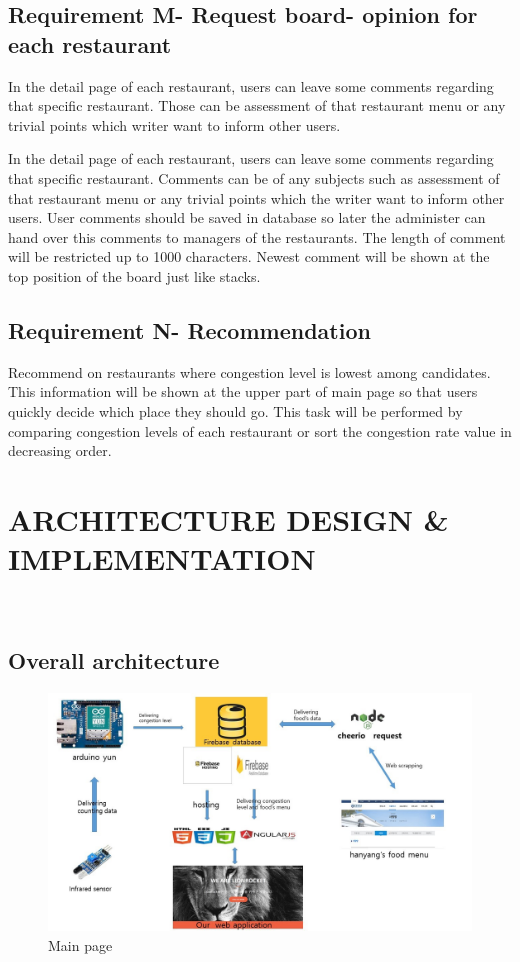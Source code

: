 \documentclass[journal]{IEEEtran}
\begin{document}
\subsection{Requirement M- Request board- opinion for each restaurant}
In the detail page of each restaurant, users can leave some comments regarding that specific restaurant. Those can be assessment of that restaurant menu or any trivial points which writer want to inform other users.  


In the detail page of each restaurant, users can leave some comments regarding that specific restaurant. Comments can be of any subjects such as assessment of that restaurant menu or any trivial points which the writer want to inform other users. User comments should be saved in database so later the administer can hand over this comments to managers of the restaurants. The length of comment will be restricted up to 1000 characters. Newest comment will be shown at the top position of the board just like stacks.

\subsection{Requirement N- Recommendation}
Recommend on restaurants where congestion level is lowest among candidates. This information will be shown at the upper part of main page so that users quickly decide which place they should go. This task will be performed by comparing congestion levels of each restaurant or sort the congestion rate value in decreasing order. 




\section{ARCHITECTURE DESIGN \& IMPLEMENTATION}\\


\subsection{Overall architecture}


\begin{figure}[h]
\centering
\includegraphics[scale=0.25]{map.jpg}
\caption{Main page}
\label{fig:Main page}
\end{figure}
\end{document}
